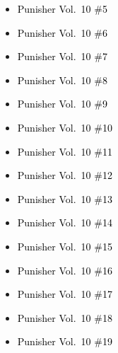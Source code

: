 \documentclass[12pt]{article}
\newcommand{\checkbox}{\raisebox{0.0ex}{\fbox{\rule{0ex}{1.5ex} \rule{1.5ex}{0ex}}}}
\begin{document}
\vspace{0.3cm}
\noindent
\begin{tcolorbox}[
  colback=white!95!gray,
  colframe=black,
  width=\textwidth,
  arc=4mm,
  auto outer arc,
  boxrule=0.8pt,
  left=8pt,right=8pt,top=8pt,bottom=8pt
]
\begin{itemize}[left=0pt,label={\checkbox}]
    \item \textcolor{black}{Punisher Vol.\ 10 \#5}
    \item \textcolor{black}{Punisher Vol.\ 10 \#6}
    \item \textcolor{black}{Punisher Vol.\ 10 \#7}
    \item \textcolor{black}{Punisher Vol.\ 10 \#8}
    \item \textcolor{black}{Punisher Vol.\ 10 \#9}
    \item \textcolor{black}{Punisher Vol.\ 10 \#10}
    \item \textcolor{black}{Punisher Vol.\ 10 \#11}
    \item \textcolor{black}{Punisher Vol.\ 10 \#12}
    \item \textcolor{black}{Punisher Vol.\ 10 \#13}
    \item \textcolor{black}{Punisher Vol.\ 10 \#14}
    \item \textcolor{black}{Punisher Vol.\ 10 \#15}
    \item \textcolor{black}{Punisher Vol.\ 10 \#16}
    \item \textcolor{black}{Punisher Vol.\ 10 \#17}
    \item \textcolor{black}{Punisher Vol.\ 10 \#18}
    \item \textcolor{black}{Punisher Vol.\ 10 \#19}
\end{itemize}
\end{tcolorbox}

\newpage
{}
\end{document}
